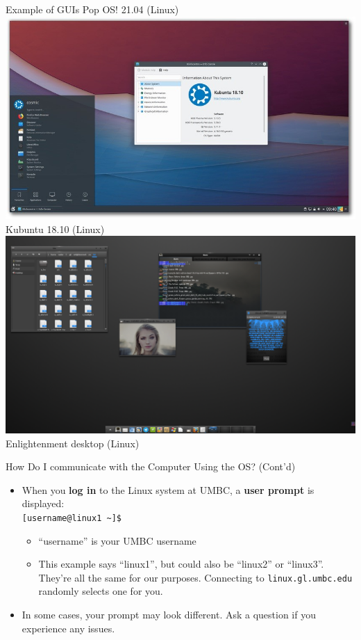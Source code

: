 \documentclass[graphics]{beamer}
\begin{document}
\begin{frame}{Example of GUIs}
{        \footnotesize{Pop OS! 21.04 (Linux)}
    }
     {
        \includegraphics[scale=0.43]{L03_OperatingSystems/L3_kubuntu.jpg}
        \footnotesize{Kubuntu 18.10 (Linux)}
    }
     {
        \includegraphics[scale=0.181]{L03_OperatingSystems/L3_enlightenment.png}
        \footnotesize{Enlightenment desktop (Linux)}
    }
\end{frame}

\begin{frame}{How Do I communicate with the Computer Using the OS? (Cont'd)}
    \begin{itemize}
        \item When you \textbf{log in} to the Linux system at UMBC, a \textbf{user prompt} is displayed: \\ \texttt{[username@linux1 \textasciitilde]\$}
        \begin{itemize}
            \item ``username'' is your UMBC username
            \item This example says ``linux1'', but could also be ``linux2'' or ``linux3''. They're all the same for our purposes. Connecting to \texttt{linux.gl.umbc.edu} randomly selects one for you.
        \end{itemize}
        \item In some cases, your prompt may look different. Ask a question if you experience any issues.
    \end{itemize}
\end{frame}
\end{document}
